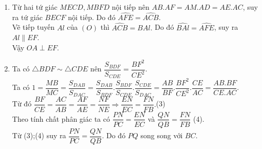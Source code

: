 \begin{ex}
{\begin{enumerate}
   		\item Từ hai tứ giác $MECD,MBFD$ nội tiếp nên $AB.AF=AM.AD=AE.AC$, suy ra tứ giác $BECF$ nội tiếp. Do đó $\widehat{AFE}=\widehat{ACB}.$\\
   		Vẽ tiếp tuyến $Al$ của $(O)$ thì $\widehat{ACB}=\widehat{BAl}.$ Do đó $\widehat{BAl}=\widehat{AFE}$, suy ra $Al\parallel EF$.\\
   		Vậy $OA\perp EF$.
   		\item Ta có $\triangle BDF\sim \triangle CDE$ nên $\dfrac{S_{BDF}}{S_{CDE}}=\dfrac{BF^2}{CE^2}$.\\
   		Ta có $1=\dfrac{MB}{MC}=\dfrac{S_{DAB}}{S_{DAC}}=\dfrac{S_{DAB}}{S_{BDF}}.\dfrac{S_{BDF}}{S_{CDE}}.\dfrac{S_{CDE}}{S_{DAC}}=\dfrac{AB}{BF}.\dfrac{BF^2}{CE^2}.\dfrac{CE}{AC}=\dfrac{AB.BF}{CE.AC}.$\\
   		Từ đó $\dfrac{BF}{CE}=\dfrac{AC}{AB}=\dfrac{AF}{AE}=\dfrac{NF}{NE}\Rightarrow \dfrac{EN}{EC}=\dfrac{FN}{FB}.$(3)\\
   		Theo tính chất phân giác ta có $\dfrac{PN}{PC}=\dfrac{EN}{EC}$ và $\dfrac{QN}{QB}=\dfrac{FN}{FB}$ (4).\\
   		Từ (3);(4) suy ra $\dfrac{PN}{PC}=\dfrac{QN}{QB}$. Do đó $PQ$ song song với $BC$.
   	\end{enumerate}
} 
\end{ex}
